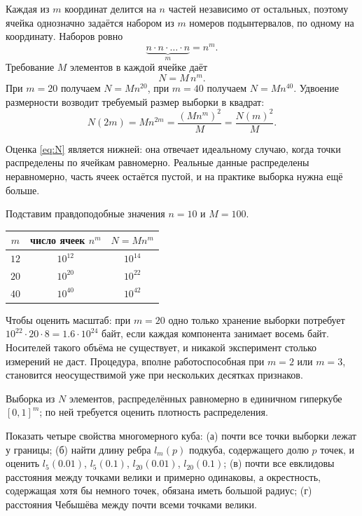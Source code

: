 \documentclass[12pt,a4paper]{article}
\begin{document}
\resh Каждая из $m$ координат делится на $n$ частей независимо от остальных,
поэтому ячейка однозначно задаётся набором из $m$ номеров подынтервалов, по
одному на координату. Наборов ровно
\[
  \underbrace{n \cdot n \cdot \ldots \cdot n}_{m} = n^m .
\]
Требование $M$ элементов в каждой ячейке даёт
\begin{equation}\label{eq:N}
  N = M\,n^m .
\end{equation}
При $m = 20$ получаем $N = M n^{20}$, при $m = 40$ получаем $N = M n^{40}$.
Удвоение размерности возводит требуемый размер выборки в квадрат:
\[
  N(2m) = M n^{2m} = \frac{(M n^{m})^2}{M} = \frac{N(m)^2}{M} .
\]

Оценка \eqref{eq:N} является нижней: она отвечает идеальному случаю, когда точки
распределены по ячейкам равномерно. Реальные данные распределены неравномерно,
часть ячеек остаётся пустой, и на практике выборка нужна ещё больше.

Подставим правдоподобные значения $n = 10$ и $M = 100$.

\begin{center}
\begin{tabular}{ccc}
\toprule
$m$ & число ячеек $n^m$ & $N = M n^m$ \\
\midrule
$12$ & $10^{12}$ & $10^{14}$ \\
$20$ & $10^{20}$ & $10^{22}$ \\
$40$ & $10^{40}$ & $10^{42}$ \\
\bottomrule
\end{tabular}
\end{center}

Чтобы оценить масштаб: при $m = 20$ одно только хранение выборки потребует
$10^{22}\cdot 20 \cdot 8 = 1.6\cdot10^{24}$ байт, если каждая компонента
занимает восемь байт. Носителей такого объёма не существует, и никакой
эксперимент столько измерений не даст. Процедура, вполне работоспособная при
$m = 2$ или $m = 3$, становится неосуществимой уже при нескольких десятках
признаков.

\dano Выборка из $N$ элементов, распределённых равномерно в единичном гиперкубе
$[0,1]^m$; по ней требуется оценить плотность распределения.

\treb Показать четыре свойства многомерного куба: (а) почти все точки выборки
лежат у границы; (б) найти длину ребра $l_m(p)$ подкуба, содержащего долю $p$
точек, и оценить $l_5(0.01)$, $l_5(0.1)$, $l_{20}(0.01)$, $l_{20}(0.1)$;
(в) почти все евклидовы расстояния между точками велики и примерно одинаковы, а
окрестность, содержащая хотя бы немного точек, обязана иметь большой радиус;
(г) расстояния Чебышёва между почти всеми точками велики.
\end{document}
